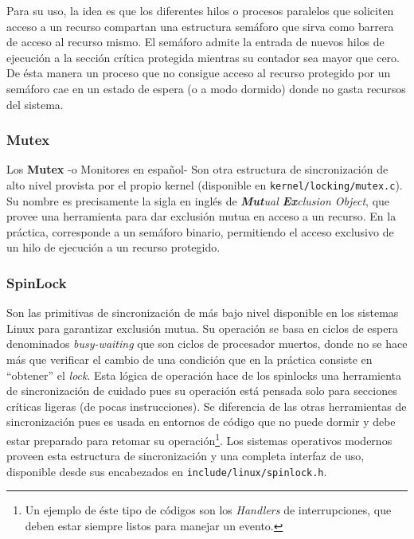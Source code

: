 Para su uso, la idea es que los diferentes hilos o procesos paralelos que soliciten acceso a un recurso compartan una estructura semáforo que sirva como barrera de acceso al recurso mismo. El semáforo admite la entrada de nuevos hilos de ejecución a la sección crítica protegida mientras su contador sea mayor que cero. De ésta manera un proceso que no consigue acceso al recurso protegido por un semáforo cae en un estado de espera (o a modo dormido) donde no gasta recursos del sistema.

\subsubsection{Mutex}
Los \textbf{Mutex} -o Monitores en español- Son otra estructura de sincronización de alto nivel provista por el propio kernel (disponible en \verb=kernel/locking/mutex.c=). Su nombre es precisamente la sigla en inglés de \emph{\textbf{Mut}ual \textbf{Ex}clusion Object}, que provee una herramienta para dar exclusión mutua en acceso a un recurso. En la práctica, corresponde a un semáforo binario, permitiendo el acceso exclusivo de un hilo de ejecución a un recurso protegido.

\subsubsection{SpinLock}
Son las primitivas de sincronización de más bajo nivel disponible en los sistemas Linux para garantizar exclusión mutua. Su operación se basa en ciclos de espera denominados \emph{busy-waiting} que son ciclos de procesador muertos, donde no se hace más que verificar el cambio de una condición que en la práctica consiste en ``obtener'' el \emph{lock}. Esta lógica de operación hace de los spinlocks una herramienta de sincronización de cuidado pues su operación está pensada solo para secciones críticas ligeras (de pocas instrucciones). Se diferencia de las otras herramientas de sincronización pues es usada en entornos de código que no puede dormir y debe estar preparado para retomar su operación\footnote{Un ejemplo de éste tipo de códigos son los \textit{Handlers} de interrupciones, que deben estar siempre listos para manejar un evento.}. Los sistemas operativos modernos proveen esta estructura de sincronización y una completa interfaz de uso, disponible desde sus encabezados en \verb=include/linux/spinlock.h=.

